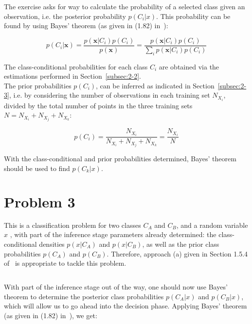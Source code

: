 \documentclass[paper=a4, fontsize=11pt]{scrartcl} %
\numberwithin{equation}{section} %
\numberwithin{figure}{section} %
\numberwithin{table}{section} %
\begin{document}
The exercise asks for way to calculate the probability of a selected class 
given an observation, i.e. the posterior probability $p(C_i|x)$. This 
probability can be found by using Bayes' theorem (as given in (1.82) 
in~\cite{Bishop2006}):

\begin{equation}
    p(C_i|\textbf{x}) = \frac{p(\textbf{x}|C_i)p(C_i)}{p(\textbf{x})} = \frac{p(\textbf{x}|C_i)p(C_i)}{\sum\limits_{i} p(\textbf{x}|C_i) p(C_i)}
    \label{eq:posterior}
\end{equation}

The class-conditional probabilities for each class $C_i$ are obtained via the 
estimations performed in Section~\ref{subsec:2-2}.\\

The prior probabilities $p(C_i)$, can be inferred as indicated in Section~\ref{subsec:2-3}, i.e. by 
considering the number of observations in each training set $N_{X_i}$, 
divided by the total number of points in the three training sets $N = N_{X_i} 
+ N_{X_j} + N_{X_k}$:

\begin{equation}
    p(C_i) = \frac{N_{X_i}}{N_{X_i} + N_{X_j} + N_{X_k}} = \frac{N_{X_i}}{N}
    \label{eq:prior}
\end{equation}

With the class-conditional and prior probabilities determined, Bayes' theorem 
should be used to find $p(C_k|x)$.\\

\section{Problem 3}

This is a classification problem for two classes $C_A$ and $C_B$, and a random 
variable \textbf{$x$} , with part of the inference stage parameters 
already determined: the class-conditional densities $p(x|C_A)$ and $p(x|C_B)$, 
as well as the prior class probabilities $p(C_A)$ and $p(C_B)$. Therefore, 
approach (a) given in Section 1.5.4 of~\cite{Bishop2006} is appropriate to 
tackle this problem.

\subsection{}
\label{subsec:3-1}

With part of the inference stage out of the way, one should now use Bayes' 
theorem to determine the posterior class probabilities $p(C_A|x)$ and 
$p(C_B|x)$, which will allow us to go ahead into the decision phase. 
Applying Bayes' theorem (as given in (1.82) in~\cite{Bishop2006}), we get:
\end{document}
